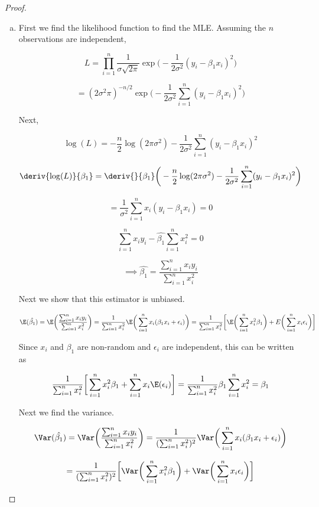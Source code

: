 \begin{proof}

 \begin{enumerate}[(a)]

\item First we find the likelihood function to find the MLE. Assuming the \(n\) observations are independent,

\[
L = \prod_{i=1}^n \frac{1}{\sigma\sqrt{2\pi}} \exp\bigg(-\frac{1}{2\sigma^2}(y_i - \beta_1 x_i)^2 \bigg)
\]

\[
= 
(2\sigma^2 \pi)^{-n/2}\exp \bigg(-\frac{1}{2\sigma^2} \sum_{i=1}^n (y_i - \beta_1 x_i)^2 \bigg)
\]

Next,

\[
\log(L) = -\frac{n}{2} \log(2 \pi \sigma^2) -\frac{1}{2\sigma^2} \sum_{i=1}^n (y_i - \beta_1 x_i)^2 
\]

\[
\deriv{\log(L)}{\beta_1} = \deriv{}{\beta_1} \bigg(  -\frac{n}{2} \log(2 \pi \sigma^2) -\frac{1}{2\sigma^2} \sum_{i=1}^n (y_i - \beta_1 x_i)^2  \bigg)
\]

\[
= \frac{1}{\sigma^2} \sum_{i=1}^n x_i(y_i - \beta_1 x_i) = 0
\]

\[
\sum_{i=1}^n x_i y_i - \hat{\beta_1} \sum_{i=1}^n x_i^2 = 0
\]

\[
\implies \hat{\beta_1} = \frac{\sum_{i=1}^n x_i y_i }{\sum_{i=1}^n x_i^2}
\]

Next we show that this estimator is unbiased.

\[
\E(\hat{\beta_1}) = \E \bigg( \frac{\sum_{i=1}^n x_i y_i }{\sum_{i=1}^n x_i^2} \bigg) = \frac{1}{\sum_{i=1}^n x_i^2} \E \bigg( \sum_{i=1}^n x_i (\beta_1 x_i + \epsilon_i) \bigg) = \frac{1}{\sum_{i=1}^n x_i^2} \bigg[\E \bigg(\sum_{i=1}^n x_i^2 \beta_1 \bigg) + E \bigg(\sum_{i=1}^n x_i \epsilon_i \bigg) \bigg]
\]

Since \(x_i\) and \(\beta_1\) are non-random and \(\epsilon_i\) are independent, this can be written as

\[
\frac{1}{\sum_{i=1}^n x_i^2} \bigg[\sum_{i=1}^n x_i^2 \beta_1 + \sum_{i=1}^n x_i \E(\epsilon_i)  \bigg] =  \frac{1}{\sum_{i=1}^n x_i^2} \beta_1 \sum_{i=1}^n x_i^2 = \beta_1
\]

Next we find the variance.

\[
\Var(\hat{\beta_1}) =  \Var \bigg( \frac{\sum_{i=1}^n x_i y_i }{\sum_{i=1}^n x_i^2} \bigg) = \frac{1}{(\sum_{i=1}^n x_i^2)^2} \Var \bigg( \sum_{i=1}^n x_i (\beta_1 x_i + \epsilon_i) \bigg)
\]

\[
= \frac{1}{(\sum_{i=1}^n x_i^2)^2} \bigg[\Var \bigg(\sum_{i=1}^n x_i^2 \beta_1 \bigg) + \Var \bigg(\sum_{i=1}^n x_i \epsilon_i \bigg) \bigg]
\]


\end{enumerate}
\end{proof}
